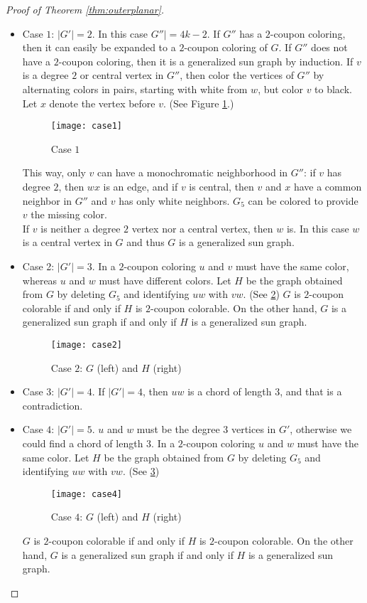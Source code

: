 \begin{proof}[Proof of Theorem \ref{thm:outerplanar}]
  \begin{itemize}
    \item Case $1$: $|G'| = 2$.
      In this case $G''| = 4k - 2$. If $G''$ has a $2$-coupon coloring, then
      it can easily be expanded to a $2$-coupon coloring of $G$. If $G''$ does
      not have a $2$-coupon coloring, then it is a generalized sun graph by induction.
      If $v$ is a degree $2$ or central vertex in $G''$, then color the vertices of $G''$ by
      alternating colors in pairs, starting with white from $w$, but color $v$ to
      black. Let $x$ denote the vertex before $v$. (See Figure \ref{fig:case1}.)
      \begin{figure}[h]
        \centering
        \texttt{[image: case1]}
        \caption{Case $1$}
        \label{fig:case1}
      \end{figure}
      This way, only $v$ can have a monochromatic neighborhood in $G''$: if $v$ has degree
      $2$, then $wx$ is an edge, and if $v$ is central, then $v$ and $x$ have a common
      neighbor in $G''$ and $v$ has only white neighbors. $G_5$ can be colored to
      provide $v$ the missing color. \\

      If $v$ is neither a degree $2$ vertex nor a central vertex, then $w$ is. In
      this case $w$ is a central vertex in $G$ and thus $G$ is a generalized sun graph.
    \item Case 2: $|G'| = 3$.
      In a $2$-coupon coloring $u$ and $v$ must have the same color, whereas $u$
      and $w$ must have different colors. Let $H$ be the graph obtained from $G$
      by deleting $G_5$ and identifying $uw$ with $vw$. (See \ref{fig:case2})
      $G$ is $2$-coupon colorable if and only if $H$ is $2$-coupon colorable. On the other hand,
      $G$ is a generalized sun graph if and only if $H$ is a generalized sun graph.
      \begin{figure}[h]
        \centering
        \texttt{[image: case2]}
        \caption{Case $2$: $G$ (left) and $H$ (right)}
        \label{fig:case2}
      \end{figure}
    \item Case $3$: $|G'| = 4$.
      If $|G'| = 4$, then $uw$ is a chord of length $3$, and that is a contradiction.
    \item Case $4$: $|G'| = 5$.
      $u$ and $w$ must be the degree $3$ vertices in $G'$, otherwise we could
      find a chord of length $3$. In a $2$-coupon coloring $u$ and $w$ must have
      the same color. Let $H$ be the graph obtained from $G$ by deleting $G_5$
      and identifying $uw$ with $vw$. (See \ref{fig:case4})
      \begin{figure}[h]
        \centering
        \texttt{[image: case4]}
        \caption{Case $4$: $G$ (left) and $H$ (right)}
        \label{fig:case4}
      \end{figure}
      $G$ is $2$-coupon colorable if and only if $H$ is $2$-coupon colorable. On the other hand,
      $G$ is a generalized sun graph if and only if $H$ is a generalized sun graph.
  \end{itemize}
\end{proof}

